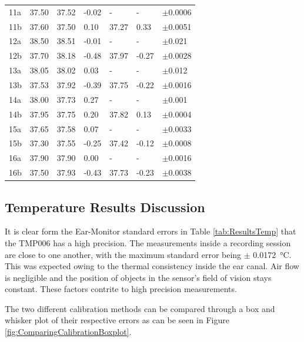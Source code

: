 \begin{table}[H]
\begin{tabular}{|P{1.4cm} | P{1.4cm} || P{1.6cm} |P{1.2cm}| |P{1.6cm} |P{1.2cm}|P{2cm}|}
11a	&	37.50	&	37.52 	&	-0.02	&	-		&	-		&	$\pm$0.0006\\
11b	&	37.60	&	37.50 	&	0.10	&	37.27	&	0.33	&	$\pm$0.0051\\
12a	&	38.50	&	38.51 	&	-0.01	&	-		&	-		&	$\pm$0.021\\
12b	&	37.70	&	38.18 	&	-0.48	&	37.97	&	-0.27	&	$\pm$0.0028\\
13a	&	38.05	&	38.02 	&	0.03	&	-		&	-		&	$\pm$0.012\\
13b	&	37.53	&	37.92 	&	-0.39	&	37.75	&	-0.22	&	$\pm$0.0016\\
14a	&	38.00	&	37.73 	&	0.27	&	-		&	-		&	$\pm$0.001\\
14b	&	37.95	&	37.75 	&	0.20	&	37.82	&	0.13	&	$\pm$0.0004\\
15a	&	37.65	&	37.58 	&	0.07	&	-		&	-		&	$\pm$0.0033\\
15b	&	37.30	&	37.55 	&	-0.25	&	37.42	&	-0.12	&	$\pm$0.0008\\
16a	&	37.90	&	37.90 	&	0.00	&	-		&	-		&	$\pm$0.0016\\
16b	&	37.50	&	37.93 	&	-0.43	&	37.73	&	-0.23	&	$\pm$0.0038\\
\hline
\end{tabular}
\end{table}

\subsection{Temperature Results Discussion}
It is clear form the Ear-Monitor standard errors in Table \ref{tab:ResultsTemp} that the TMP006 has a high precision. The measurements inside a recording session are close to one another, with the maximum standard error being $\pm$ \SI{0.0172}{\celsius}. This was expected owing to the thermal consistency inside the ear canal. Air flow is negligible and the position of objects in the sensor's field of vision stays constant. These factors contrite to high precision measurements.

\medskip

The two different calibration methods can be compared through a box and whisker plot of their respective errors as can be seen in Figure \ref{fig:ComparingCalibrationBoxplot}. 

